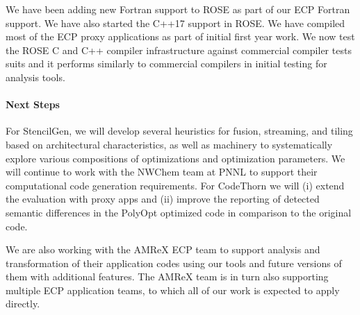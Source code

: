 We have been adding new Fortran support to ROSE as part of our ECP Fortran support. We have also started 
the C++17 support in ROSE. We have compiled most of the ECP proxy applications as part of initial first 
year work. We now test the ROSE C and C++ compiler infrastructure against commercial compiler tests suits
and it performs similarly to commercial compilers in initial testing for analysis tools.



\paragraph{Next Steps}

For StencilGen, we will develop several heuristics for fusion, streaming, and tiling based on architectural 
characteristics, as well as machinery to systematically explore various compositions of optimizations and 
optimization parameters. We will continue to work with the NWChem team at PNNL to support their computational 
code generation requirements.
For CodeThorn we will (i) extend the evaluation with proxy apps and (ii) improve the reporting of detected 
semantic differences in the PolyOpt optimized code in comparison to the original code.

We are also working with the AMReX ECP team to support analysis and transformation of their application codes
using our tools and future versions of them with additional features.  The AMReX team is in turn also 
supporting multiple ECP application teams, to which all of our work is expected to apply directly.


 

